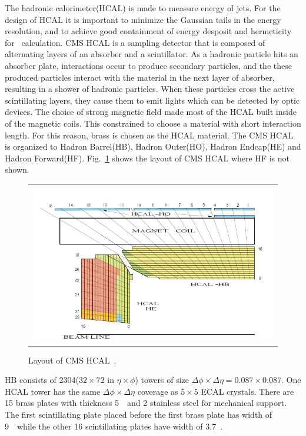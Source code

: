 The hadronic calorimeter(HCAL) is made to measure energy of jets.
For the design of HCAL it is important to minimize the Gaussian tails in the energy 
resolution, and to achieve good containment of energy desposit and 
hermeticity for \met\ calculation. CMS HCAL is a sampling detector 
that is composed of alternating layers of an absorber and a scintillator. 
As a hadronic particle hits an absorber plate, interactions occur to produce 
secondary particles, and the these produced particles interact with 
the material in the next layer of absorber, resulting in a shower of 
hadronic particles. When these particles cross the active scintillating  
layers, they cause them to emit lights which can be detected by 
optic devices. The choice of strong magnetic field made most of the 
HCAL built inside of the magnetic coils. This constrained to choose 
a material with short interaction length. For this reason, brass 
is chosen as the HCAL material. The CMS HCAL is organized to 
Hadron Barrel(HB), Hadron Outer(HO), Hadron Endcap(HE) and Hadron Forward(HF).  
Fig.~\ref{fig:hcal_layout} shows the layout of CMS HCAL where HF is not shown. 
%
\begin{figure}[h] 
\vspace{1cm}
\centering 
\begin{tabular}{|c|} 
\hline
\\
\includegraphics[width=0.99\textwidth]{figures/Hcal-segementation-updated.JPG}\\
\hline
\end{tabular} 
\caption{Layout of CMS HCAL~\cite{Chatrchyan:2009hw}.}
\label{fig:hcal_layout} 
\end{figure} 

HB consists of 2304($32 \times 72$ in $\eta \times \phi$) towers of size 
$\Delta \phi \times \Delta \eta = 0.087 \times 0.087$. One HCAL tower 
has the same $\Delta \phi \times \Delta \eta$ coverage as $5\times5$
ECAL crystals. There are 15 brass plates with thickness 5~\cm\ and 
2 stainless steel for mechanical support. The first scintillating 
plate placed before the first brass plate has width of 9~\mm\ while 
the other 16 scintillating plates have width of 3.7~\mm. 

